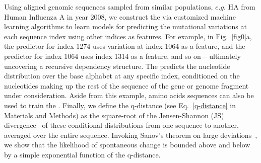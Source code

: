 \documentclass[onecolumn, compsoc,10pt]{IEEEtran}
\newif\iftikzX
\newif\ifFIGS
\begin{document}
%     
  

Using aligned genomic sequences sampled from  similar populations, $e.g.$ HA from Human Influenza A in year 2008, we construct the \qnet via  customized machine learning algorithms to  learn models for predicting the mutational variations at each sequence index using other indices  as features. For example, in Fig.~\ref{fig0}a,  the predictor for index 1274 uses variation at index 1064 as a feature, and the predictor for index 1064 uses index 1314 as a feature, and so on -- ultimately uncovering a recursive dependency structure. The \qnet predicts the nucleotide distribution over the base alphabet at any specific index, conditioned on the nucleotides making up the rest of the sequence of the gene or genome fragment under consideration. Aside from this example, amino acids sequences can also be used to train the \qnet. Finally, we define the q-distance (see Eq.~\eqref{q-distance} in Materials and Methods) as the square-root of the Jensen-Shannon (JS) divergence~\cite{cover} of these conditional distributions from one sequence to another, averaged over the entire sequence. Invoking Sanov's theorem on large deviations~\cite{cover}, we show  that the  likelihood of spontaneous change is bounded above and below by a simple exponential function of the  q-distance. 
\end{document}
